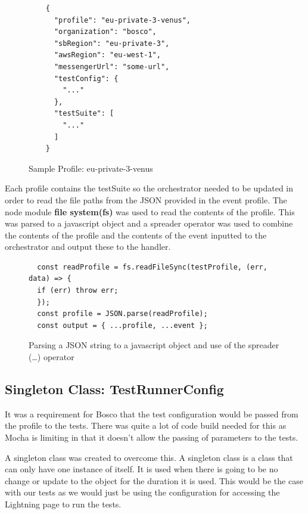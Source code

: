 \documentclass[12pt,a4paper,titlepage]{report}
\begin{document}
\begin{figure}[H]
  \begin{tcolorbox}
   \begin{verbatim}
    {
      "profile": "eu-private-3-venus",
      "organization": "bosco",
      "sbRegion": "eu-private-3",
      "awsRegion": "eu-west-1",
      "messengerUrl": "some-url",
      "testConfig": {
        "..."
      },
      "testSuite": [
        "..."
      ]
    }
   \end{verbatim}
  \end{tcolorbox}
  \caption{Sample Profile: eu-private-3-venus}
 \end{figure}

Each profile contains the testSuite so the orchestrator needed to be updated in order to read the file paths from the JSON provided in the 
event profile. The node module \textbf{file system(fs)} was used to read the contents of the profile. This was parsed to 
a javascript object and a spreader operator was used to combine the contents of the profile and the contents of 
the event inputted to the orchestrator and output these to the handler.

\begin{figure}[H]
 \begin{tcolorbox}
  \begin{verbatim}
  const readProfile = fs.readFileSync(testProfile, (err, data) => {
  if (err) throw err;
  });
  const profile = JSON.parse(readProfile);
  const output = { ...profile, ...event };
  \end{verbatim}
 \end{tcolorbox}
 \caption{Parsing a JSON string to a javascript object and use of the spreader (\dots) operator}
\end{figure}

\subsection{Singleton Class: TestRunnerConfig}
It was a requirement for Bosco that the test configuration would be passed from the profile to the tests. 
There was quite a lot of code build needed for this as Mocha is limiting in that it doesn't 
allow the passing of parameters to the tests. 

A singleton class was created to overcome this. A singleton class is a class that can only have one instance of 
itself. It is used when there is going to be no change or update to the object for the duration it is used. 
This would be the case with our tests as we would just be using the configuration for accessing the Lightning page to run the tests.
\end{document}
